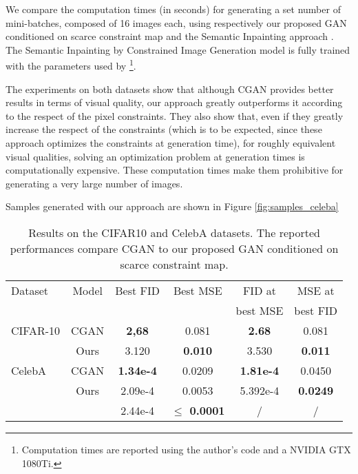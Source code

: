  We compare the computation times (in seconds) for generating a set number of mini-batches, composed of 16 images each, using respectively our proposed GAN conditioned on scarce constraint map and the Semantic Inpainting approach \citep{Yeh2017}. The  Semantic Inpainting by Constrained Image Generation model is fully trained with the parameters used by \citet{Yeh2017} \footnote{Computation times are reported using the author's code and a NVIDIA GTX 1080Ti. }.
 
 The experiments on both datasets show that although CGAN  provides better results in terms of visual quality, our approach greatly outperforms it according to the respect of the pixel constraints. They also show that, even if they greatly increase the respect of the constraints (which is to be expected, since these approach optimizes the constraints at generation time), for roughly equivalent visual qualities, solving an optimization problem at generation times is computationally expensive. These computation times make them prohibitive for generating a very large number of images.
 
  Samples generated with our approach are shown in Figure \ref{fig:samples_celeba}

\begin{table}[t]
	\centering
	\begin{tabular}{l c c c c c }
		\Bigrule
		Dataset &Model           & Best \ac{FID} & Best \ac{MSE} & \ac{FID} at & \ac{MSE} at \\
		&&&&best \ac{MSE} & best \ac{FID} \\
		\bigrule
		CIFAR-10 &CGAN   & \textbf{2,68}  & 0.081  & \textbf{2.68}  & 0.081\\
		&Ours            & 3.120 & \textbf{0.010} & 3.530 & \textbf{0.011} \\    
		\bigrule
		CelebA &CGAN      & \textbf{1.34e-4} & 0.0209 &  \textbf{1.81e-4} & 0.0450\\
		&Ours            & 2.09e-4& 0.0053 & 5.392e-4 & \textbf{0.0249} \\
		&\citet{Yeh2017} & 2.44e-4& \textbf{$\leq$ 0.0001} & / & / \\
	\end{tabular}
	
	\caption[Results on the CIFAR10 and CelebA datasets]{Results on the CIFAR10 and CelebA datasets. The reported performances compare CGAN to our proposed GAN conditioned on scarce constraint map.}
	\label{tab:cifar10}
\end{table}

